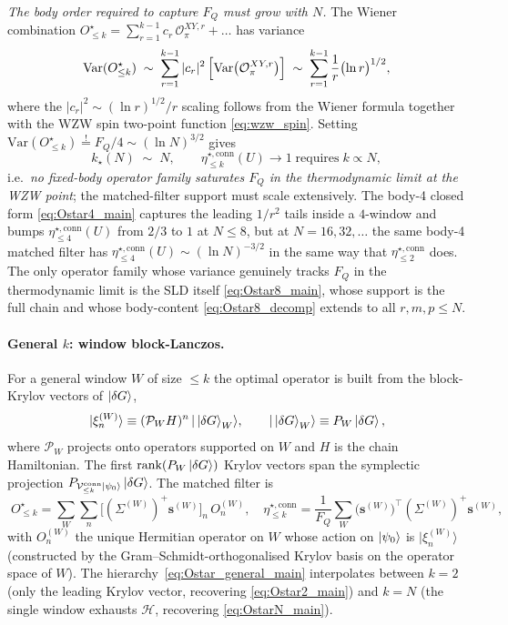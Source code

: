 \documentclass[11pt,a4paper]{article}
\newcommand{\FQ}{F_Q}
\newcommand{\Var}{\mathrm{Var}}
\newcommand{\PsiZ}{\ket{\psi_0}}
\newcommand{\dG}{\ket{\delta G}}
\newcommand{\Vconn}[1]{\mathcal{V}^{\mathrm{conn}}_{\le #1}}
\newcommand{\etaconn}[1]{\eta^{\star,\mathrm{conn}}_{\le #1}}
\begin{document}
\smallskip
\emph{The body order required to capture $\FQ$ must grow with
$N$.}  The Wiener combination
$O^\star_{\le k}=\sum_{r=1}^{k-1}c_r\,\mathcal O^{XY,r}_\pi+\dots$
has variance
\begin{equation}
   \Var(O^\star_{\le k})\;\sim\;\sum_{r=1}^{k-1}|c_r|^2
   \,\Bigl[\Var\bigl(\mathcal O^{XY,r}_\pi\bigr)\Bigr]
   \;\sim\;\sum_{r=1}^{k-1}\frac{1}{r}\bigl(\ln r\bigr)^{1/2},
   \label{eq:Var_Ostar_k_growth}
\end{equation}
where the $|c_r|^2\sim(\ln r)^{1/2}/r$ scaling follows from the
Wiener formula together with the WZW spin two-point function
\eqref{eq:wzw_spin}.  Setting
$\Var(O^\star_{\le k})\stackrel{!}{=}\FQ/4\sim(\ln N)^{3/2}$
gives
\begin{equation}
   \boxed{\;k_\star(N)\;\sim\;N,\qquad
   \etaconn{k}(U)\to 1\;\text{requires}\;k\propto N,\;}
   \label{eq:kstar_WZW}
\end{equation}
i.e.\ \emph{no fixed-body operator family saturates $\FQ$ in the
thermodynamic limit at the WZW point}; the matched-filter
support must scale extensively.  The body-4 closed form
\eqref{eq:Ostar4_main} captures the leading $1/r^2$ tails inside
a $4$-window and bumps $\etaconn{4}(U)$ from $2/3$ to $1$ at
$N\le 8$, but at $N=16,32,\dots$ the same body-4 matched filter
has $\etaconn{4}(U)\sim(\ln N)^{-3/2}$ in the same way that
$\etaconn{2}$ does.  The only operator family whose variance
genuinely tracks $\FQ$ in the thermodynamic limit is the SLD
itself \eqref{eq:Ostar8_main}, whose support is the full chain
and whose body-content
\eqref{eq:Ostar8_decomp} extends to all $r,m,p\le N$.

\paragraph{General $k$: window block-Lanczos.}
For a general window $W$ of size $\le k$ the optimal operator is
built from the block-Krylov vectors of $\dG$,
\begin{equation}
   |\xi^{(W)}_n\rangle\equiv (\mathcal P_W H)^n\,|\dG_W\rangle,
   \qquad |\dG_W\rangle\equiv P_W\dG,
   \label{eq:Krylov_main}
\end{equation}
where $\mathcal P_W$ projects onto operators supported on $W$ and
$H$ is the chain Hamiltonian.  The first
$\mathrm{rank}(P_W\dG)$ Krylov vectors span the symplectic
projection $P_{\Vconn{k}\PsiZ}\dG$.  The matched filter is
\begin{equation}
   \boxed{\;O^\star_{\le k}=\sum_W\sum_n
   \bigl[(\Sigma^{(W)})^+\mathbf s^{(W)}\bigr]_n\,O^{(W)}_n,\quad
   \etaconn{k}=\frac{1}{\FQ}\sum_W
   \bigl(\mathbf s^{(W)}\bigr)^\top(\Sigma^{(W)})^+
   \mathbf s^{(W)},\;}
   \label{eq:Ostar_general_main}
\end{equation}
with $O^{(W)}_n$ the unique Hermitian operator on $W$ whose
action on $\PsiZ$ is $|\xi^{(W)}_n\rangle$ (constructed by the
Gram--Schmidt-orthogonalised Krylov basis on the operator space
of $W$).  The hierarchy~\eqref{eq:Ostar_general_main} interpolates
between $k=2$ (only the leading Krylov vector, recovering
\eqref{eq:Ostar2_main}) and $k=N$ (the single window exhausts
$\mathcal H$, recovering \eqref{eq:OstarN_main}).
\end{document}
